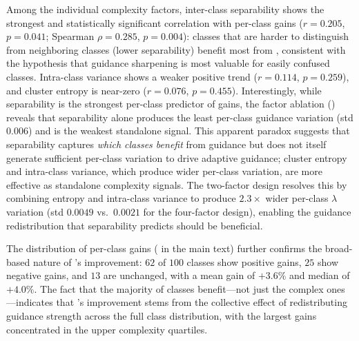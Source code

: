 Among the individual complexity factors, inter-class separability shows the strongest and statistically significant correlation with per-class gains ($r = 0.205$, $p = 0.041$; Spearman $\rho = 0.285$, $p = 0.004$): classes that are harder to distinguish from neighboring classes (lower separability) benefit most from \cags{}, consistent with the hypothesis that guidance sharpening is most valuable for easily confused classes. Intra-class variance shows a weaker positive trend ($r = 0.114$, $p = 0.259$), and cluster entropy is near-zero ($r = 0.076$, $p = 0.455$). Interestingly, while separability is the strongest per-class predictor of gains, the factor ablation () reveals that separability alone produces the least per-class guidance variation (std $0.006$) and is the weakest standalone signal. This apparent paradox suggests that separability captures \emph{which classes benefit} from guidance but does not itself generate sufficient per-class variation to drive adaptive guidance; cluster entropy and intra-class variance, which produce wider per-class variation, are more effective as standalone complexity signals. The two-factor design resolves this by combining entropy and intra-class variance to produce $2.3\times$ wider per-class $\lambda$ variation (std $0.0049$ vs.\ $0.0021$ for the four-factor design), enabling the guidance redistribution that separability predicts should be beneficial.

The distribution of per-class gains ( in the main text) further confirms the broad-based nature of \cags{}'s improvement: $62$ of $100$ classes show positive gains, $25$ show negative gains, and $13$ are unchanged, with a mean gain of $+3.6\%$ and median of $+4.0\%$. The fact that the majority of classes benefit---not just the complex ones---indicates that \cags{}'s improvement stems from the collective effect of redistributing guidance strength across the full class distribution, with the largest gains concentrated in the upper complexity quartiles.

